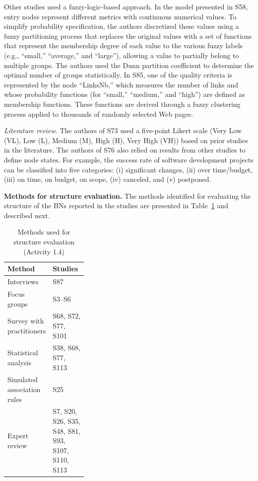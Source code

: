 Other studies used a fuzzy-logic-based approach. In the model presented in S58, entry nodes represent different metrics with continuous numerical values. To simplify probability specification, the authors discretized these values using a fuzzy partitioning process that replaces the original values with a set of functions that represent the membership degree of each value to the various fuzzy labels (e.g., ``small,'' ``average,'' and ``large''), allowing a value to partially belong to multiple groups. The authors used the Dunn partition coefficient to determine the optimal number of groups statistically. In S85, one of the quality criteria is represented by the node ``LinksNb,'' which measures the number of links and whose probability functions (for ``small,'' ``medium,'' and ``high'') are defined as membership functions. These functions are derived through a fuzzy clustering process applied to thousands of randomly selected Web pages.

\textit{Literature review.} The authors of S73 used a five-point Likert scale (Very Low (VL), Low (L), Medium (M), High (H), Very High (VH)) based on prior studies in the literature. The authors of S76 also relied on results from other studies to define node states. For example, the success rate of software development projects can be classified into five categories: (i) significant changes, (ii) over time/budget, (iii) on time, on budget, on scope, (iv) canceled, and (v) postponed.

\vspace*{0.5\baselineskip}

\textbf{Methods for structure evaluation.} The methods identified for evaluating the structure of the BNs reported in the studies are presented in Table~\ref{tab:metodos_avaliacao_estrutura} and described next.

\begin{table}[t]
\caption{Methods used for structure evaluation (Activity 1.4)}
\label{tab:metodos_avaliacao_estrutura}
\centering
\small
\setlength{\tabcolsep}{6pt}
\renewcommand{\arraystretch}{1.2}

\begin{tabularx}{0.80\linewidth}{>{\raggedright\arraybackslash}p{0.32\linewidth}
                              >{\raggedright\arraybackslash}X}
\toprule
\textbf{Method} & \textbf{Studies} \\
\midrule
Interviews
& S87 \\
Focus groups
& S3--S6 \\
Survey with practitioners
& S68, S72, S77, S101 \\
Statistical analysis
& S38, S68, S77, S113 \\
Simulated association rules
& S25 \\
Expert review
& S7, S20, S26, S35, S48, S81, S93, S107, S110, S113 \\
\bottomrule
\end{tabularx}
\end{table}

